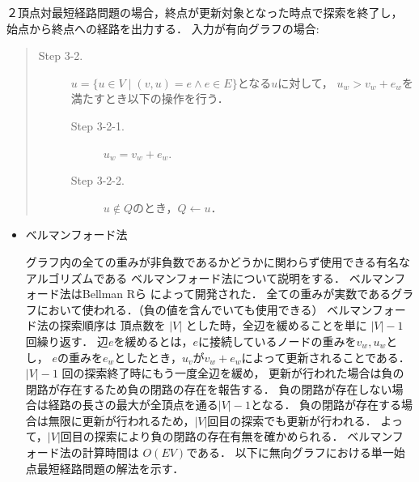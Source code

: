\documentclass[12pt]{optlab-bachelor}
\begin{document}
２頂点対最短経路問題の場合，終点が更新対象となった時点で探索を終了し，
始点から終点への経路を出力する．
入力が有向グラフの場合:
\begin{quote}
\begin{description}
\item[Step 3-2.] $u = \{ u \in V \mid (v,u) = e \land e \in E \}$となる$u$に対して，
$u_w > v_w + e_w$を満たすとき以下の操作を行う．
\begin{description}
  \item[Step 3-2-1.] $u_w = v_w + e_w$.
  \item[Step 3-2-2.] $u \notin Q$のとき，$Q \leftarrow u$．
\end{description}
\end{description}
\end{quote}

\begin{itemize}
  \item ベルマンフォード法

  グラフ内の全ての重みが非負数であるかどうかに関わらず使用できる有名なアルゴリズムである
  ベルマンフォード法について説明をする．
  ベルマンフォード法はBellman Rら \cite{Bellman}によって開発された．
  全ての重みが実数であるグラフにおいて使われる．（負の値を含んでいても使用できる）
  ベルマンフォード法の探索順序は
  頂点数を $|V|$ とした時，全辺を緩めることを単に $|V|-1$ 回繰り返す．
  辺$e$を緩めるとは，$e$に接続しているノードの重みを$v_w,u_w$とし，
  $e$の重みを$e_w$としたとき，$u_v$が$v_w+e_w$によって更新されることである．
  $|V|-1$ 回の探索終了時にもう一度全辺を緩め，
  更新が行われた場合は負の閉路が存在するため負の閉路の存在を報告する．
  負の閉路が存在しない場合は経路の長さの最大が全頂点を通る$|V|-1$となる．
  負の閉路が存在する場合は無限に更新が行われるため，$|V|$回目の探索でも更新が行われる．
  よって，$|V|$回目の探索により負の閉路の存在有無を確かめられる．
  ベルマンフォード法の計算時間は $O(EV)$である．
  以下に無向グラフにおける単一始点最短経路問題の解法を示す．


\end{itemize}
\end{document}
